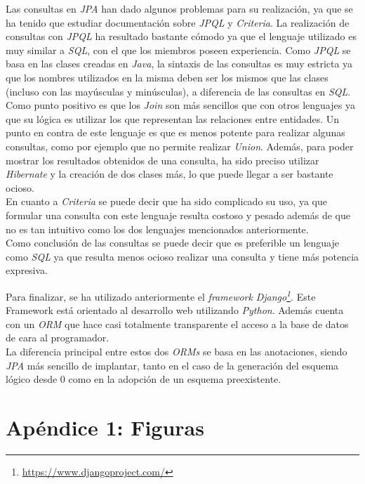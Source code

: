 \documentclass[11pt,a4paper]{article}
\begin{document}
Las consultas en \textit{JPA} han dado algunos problemas para su realización, ya que se ha tenido que estudiar documentación sobre \textit{JPQL} y \textit{Criteria}.
La realización de consultas con \textit{JPQL} ha resultado bastante cómodo ya que el lenguaje utilizado es muy similar a \textit{SQL}, con el que los miembros poseen experiencia. Como \textit{JPQL} se basa en las clases creadas en \textit{Java}, la sintaxis de las consultas es muy estricta ya que los nombres utilizados en la misma deben ser los mismos que las clases (incluso con las mayúsculas y minúsculas), a diferencia de las consultas en \textit{SQL}. Como punto positivo es que los \textit{Join} son más sencillos que con otros lenguajes ya que su lógica es utilizar los que representan las relaciones entre entidades. Un punto en contra de este lenguaje es que es menos potente para realizar algunas consultas, como por ejemplo que no permite realizar \textit{Union}. Además, para poder mostrar los resultados obtenidos de una consulta, ha sido preciso utilizar \textit{Hibernate} y la creación de dos clases más, lo que puede llegar a ser bastante ocioso.\\

En cuanto a \textit{Criteria} se puede decir que ha sido complicado su uso, ya que formular una consulta con este lenguaje resulta costoso y pesado además de que no es tan intuitivo como los dos lenguajes mencionados anteriormente.\\
Como conclusión de las consultas se puede decir que es preferible un lenguaje como \textit{SQL} ya que resulta menos ocioso realizar una consulta y tiene más potencia expresiva.

Para finalizar, se ha utilizado anteriormente el \textit{framework} \emph{Django\footnote{\url{https://www.djangoproject.com/}}}. Este Framework está orientado al desarrollo web utilizando \emph{Python}. Además cuenta con un \emph{ORM} que hace casi totalmente transparente el acceso a la base de datos de cara al programador.\\
La diferencia principal entre estos dos \emph{ORMs} se basa en las anotaciones, siendo \emph{JPA} más sencillo de implantar, tanto en el caso de la generación del esquema lógico desde 0 como en la adopción de un esquema preexistente.

\newpage
\section{Apéndice 1: Figuras}
\end{document}
